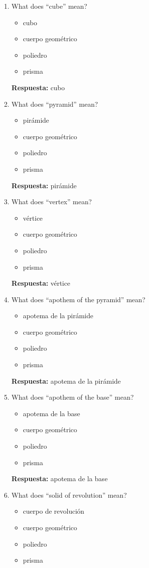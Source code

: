 \documentclass[11pt,a4paper]{article}
\begin{document}
\begin{enumerate}
\item What does ``cube'' mean?
\begin{itemize}
\item cubo
\item cuerpo geométrico
\item poliedro
\item prisma
\end{itemize}
\textbf{Respuesta:} cubo
\item What does ``pyramid'' mean?
\begin{itemize}
\item pirámide
\item cuerpo geométrico
\item poliedro
\item prisma
\end{itemize}
\textbf{Respuesta:} pirámide
\item What does ``vertex'' mean?
\begin{itemize}
\item vértice
\item cuerpo geométrico
\item poliedro
\item prisma
\end{itemize}
\textbf{Respuesta:} vértice
\item What does ``apothem of the pyramid'' mean?
\begin{itemize}
\item apotema de la pirámide
\item cuerpo geométrico
\item poliedro
\item prisma
\end{itemize}
\textbf{Respuesta:} apotema de la pirámide
\item What does ``apothem of the base'' mean?
\begin{itemize}
\item apotema de la base
\item cuerpo geométrico
\item poliedro
\item prisma
\end{itemize}
\textbf{Respuesta:} apotema de la base
\item What does ``solid of revolution'' mean?
\begin{itemize}
\item cuerpo de revolución
\item cuerpo geométrico
\item poliedro
\item prisma

\end{itemize}
\end{enumerate}
\end{document}
